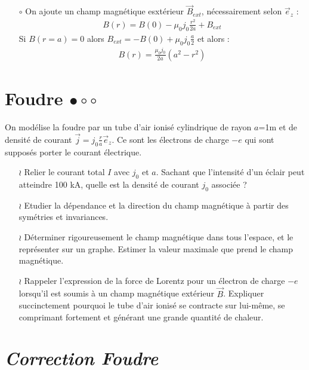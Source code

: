 \documentclass{report}
\begin{document}
\begin{itemize}
	\item[$\circ$] On ajoute un champ magnétique esxtérieur $\vec{B}_{ext}$, nécessairement selon $\vec{e}_z$ :
	\begin{align*}
		B(r) = B(0)-\mu_0j_0\frac{r^2}{2a} + B_{ext}
	\end{align*}
	Si $B(r=a)=0$ alors $B_{ext}=-B(0)+\mu_0j_0\frac{a}{2}$ et alors :
	\begin{align*}
		B(r) = \frac{\mu_0j_0}{2a}\left( a^2-r^2\right) 
	\end{align*}


\end{itemize}

\newpage

\section*{Foudre $\bullet\circ\circ$}

On modélise la foudre par un tube d'air ionisé cylindrique de rayon $a$=1m et de densité de courant $\vec{j}=j_0\frac{r}{a}\vec{e}_z$. Ce sont les électrons de charge $-e$ qui sont supposés porter le courant électrique.

\begin{itemize}

	\item[$\wr$] Relier le courant total $I$ avec $j_0$ et $a$. Sachant que l'intensité d'un éclair peut atteindre 100 kA, quelle est la densité de courant $j_0$ associée ? 

	\item[$\wr$] Etudier la dépendance et la direction du champ magnétique à partir des symétries et invariances.
	
	\item[$\wr$] Déterminer rigoureusement le champ magnétique dans tous l'espace, et le représenter sur un graphe. Estimer la valeur maximale que prend le champ magnétique.
	
	\item[$\wr$] Rappeler l'expression de la force de Lorentz pour un électron de charge $-e$ lorsqu'il est soumis à un champ magnétique extérieur $\vec{B}$. Expliquer succinctement pourquoi le tube d'air ionisé se contracte sur lui-même, se comprimant fortement et générant une grande quantité de chaleur. 

\end{itemize}

\newpage

\section*{\textit{Correction Foudre}}
\end{document}
